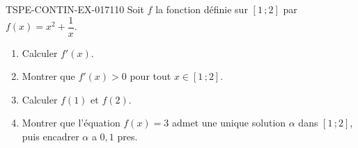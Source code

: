 \begin{exercice}{TSPE-CONTIN-EX-017}{1}{10}
Soit $f$ la fonction définie sur $[1\,;2]$ par $f(x) = x^2 + \dfrac{1}{x}$.
\begin{enumerate}
  \item Calculer $f'(x)$.
  \item Montrer que $f'(x) > 0$ pour tout $x \in [1\,;2]$.
  \item Calculer $f(1)$ et $f(2)$.
  \item Montrer que l'équation $f(x) = 3$ admet une unique solution $\alpha$ dans $[1\,;2]$, puis encadrer $\alpha$ a $0{,}1$ pres.
\end{enumerate}
\end{exercice}
